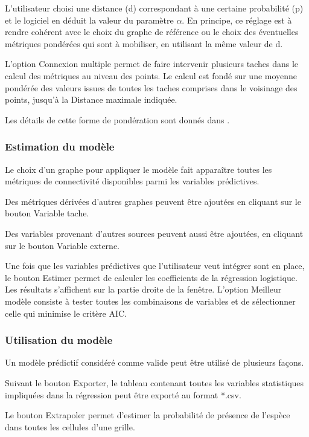 \documentclass{article}
\begin{document}
L’utilisateur choisi une distance (d) correspondant à une certaine probabilité (p) et le logiciel en déduit la valeur du paramètre $\alpha $. En principe, ce réglage est à rendre cohérent avec le choix du graphe de référence ou le choix des éventuelles métriques pondérées qui sont à mobiliser, en utilisant la même valeur de d.

L’option Connexion multiple permet de faire intervenir plusieurs taches dans le calcul des métriques au niveau des points. Le calcul est fondé sur une moyenne pondérée des valeurs issues de toutes les taches comprises dans le voisinage des points, jusqu’à la Distance maximale indiquée.

Les détails de cette forme de pondération sont donnés dans \cite{2012_SDM}.

\subsubsection{Estimation du modèle}
Le choix d’un graphe pour appliquer le modèle fait apparaître toutes les métriques de connectivité disponibles parmi les variables prédictives.

Des métriques dérivées d’autres graphes peuvent être ajoutées en cliquant sur le bouton Variable tache.

Des variables provenant d’autres sources peuvent aussi être ajoutées, en cliquant sur le bouton Variable externe.

Une fois que les variables prédictives que l’utilisateur veut intégrer sont en place, le bouton Estimer permet de calculer les coefficients de la régression logistique. Les résultats s’affichent sur la partie droite de la fenêtre. L’option Meilleur modèle consiste à tester toutes les combinaisons de variables et de sélectionner celle qui minimise le critère AIC.

\subsubsection{Utilisation du modèle}
Un modèle prédictif considéré comme valide peut être utilisé de plusieurs façons.

Suivant le bouton Exporter, le tableau contenant toutes les variables statistiques impliquées dans la régression peut être exporté au format *.csv.

Le bouton Extrapoler permet d’estimer la probabilité de présence de l’espèce dans toutes les cellules d’une grille. 
\end{document}
